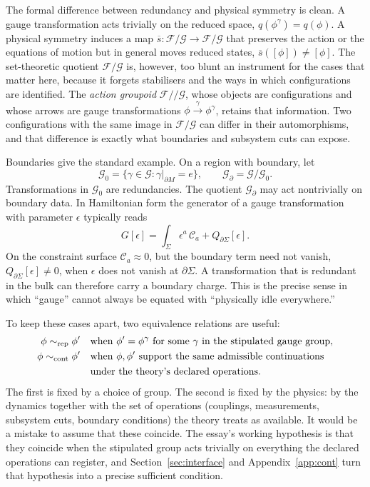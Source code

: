 \documentclass[11pt]{article}
\theoremstyle{plain}
\theoremstyle{definition}
\theoremstyle{remark}
\newcommand{\F}{\mathcal F}
\newcommand{\G}{\mathcal G}
\begin{document}
The formal difference between redundancy and physical symmetry is clean. A gauge transformation acts trivially on the reduced space, $q(\phi^\gamma)=q(\phi)$. A physical symmetry induces a map $\overline s:\F/\G\to\F/\G$ that preserves the action or the equations of motion but in general moves reduced states, $\overline s([\phi])\neq[\phi]$. The set-theoretic quotient $\F/\G$ is, however, too blunt an instrument for the cases that matter here, because it forgets stabilisers and the ways in which configurations are identified. The \emph{action groupoid} $\F/\!/\G$, whose objects are configurations and whose arrows are gauge transformations $\phi\xrightarrow{\gamma}\phi^\gamma$, retains that information. Two configurations with the same image in $\F/\G$ can differ in their automorphisms, and that difference is exactly what boundaries and subsystem cuts can expose.

Boundaries give the standard example. On a region with boundary, let
\begin{equation}
\G_0=\{\gamma\in\G:\gamma|_{\partial M}=e\},\qquad \G_\partial=\G/\G_0 .
\end{equation}
Transformations in $\G_0$ are redundancies. The quotient $\G_\partial$ may act nontrivially on boundary data. In Hamiltonian form the generator of a gauge transformation with parameter $\epsilon$ typically reads
\begin{equation}
G[\epsilon]=\int_\Sigma\epsilon^a\,\mathcal C_a+Q_{\partial\Sigma}[\epsilon].
\end{equation}
On the constraint surface $\mathcal C_a\approx0$, but the boundary term need not vanish, $Q_{\partial\Sigma}[\epsilon]\neq0$, when $\epsilon$ does not vanish at $\partial\Sigma$. A transformation that is redundant in the bulk can therefore carry a boundary charge. This is the precise sense in which ``gauge'' cannot always be equated with ``physically idle everywhere.''

To keep these cases apart, two equivalence relations are useful:
\begin{align}
\phi\sim_{\mathrm{rep}}\phi' &\quad\text{when } \phi'=\phi^\gamma \text{ for some } \gamma \text{ in the stipulated gauge group},\\
\phi\sim_{\mathrm{cont}}\phi' &\quad\text{when } \phi,\phi' \text{ support the same admissible continuations}\notag\\
&\quad\text{under the theory's declared operations}.
\end{align}
The first is fixed by a choice of group. The second is fixed by the physics: by the dynamics together with the set of operations (couplings, measurements, subsystem cuts, boundary conditions) the theory treats as available. It would be a mistake to assume that these coincide. The essay's working hypothesis is that they coincide when the stipulated group acts trivially on everything the declared operations can register, and Section~\ref{sec:interface} and Appendix~\ref{app:cont} turn that hypothesis into a precise sufficient condition.
\end{document}
